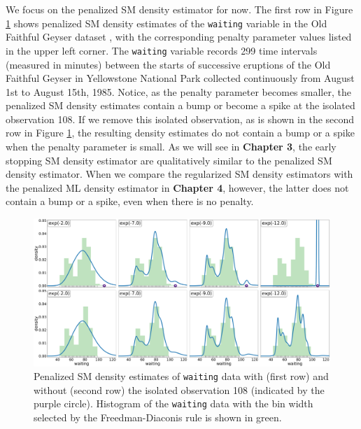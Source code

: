 \documentclass[12pt]{article}
\theoremstyle{definition}
\theoremstyle{theorem}
\theoremstyle{remark}
\begin{document}
We focus on the penalized SM density estimator for now. The first row in Figure \ref{fig-intro-1} shows penalized SM density estimates of the \texttt{waiting} variable in the Old Faithful Geyser dataset \parencite{Azzalini1990-kj}, with the corresponding penalty parameter values listed in the upper left corner. The \texttt{waiting} variable records 299 time intervals (measured in minutes) between the starts of successive eruptions of the Old Faithful Geyser in Yellowstone National Park collected continuously from August 1st to August 15th, 1985. Notice, as the penalty parameter becomes smaller, the penalized SM density estimates contain a bump or become a spike at the isolated observation 108. If we remove this isolated observation, as is shown in the second row in Figure \ref{fig-intro-1}, the resulting density estimates do not contain a bump or a spike when the penalty parameter is small. As we will see in \textbf{\color{red} Chapter 3}, the early stopping SM density estimator are qualitatively similar to the penalized SM density estimator. When we compare the regularized SM density estimators with the penalized ML density estimator in \textbf{\color{red} Chapter 4}, however, the latter does not contain a bump or a spike, even when there is no penalty. 

\begin{figure}[t]
	\centering
	\includegraphics[width=\textwidth]{../plots/waiting-PenSMonly-density-estimates-baseden=Gamma-26-3-gridpoint=1-181-1-with108-brief.pdf}
	{\caption{Penalized SM density estimates of \texttt{waiting} data with (first row) and without (second row) the isolated observation 108 (indicated by the purple circle). Histogram of the \texttt{waiting} data with the bin width selected by the Freedman-Diaconis rule \textcite{Freedman1981-oi} is shown in green. }
	\label{fig-intro-1}}
\end{figure}
\end{document}
